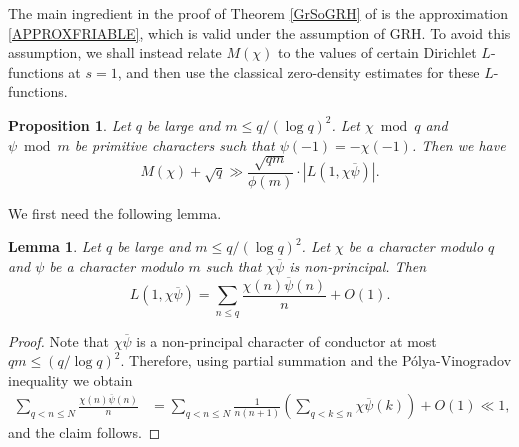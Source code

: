 \documentclass[12pt]{amsart}
\newtheorem{lem}[thm]{Lemma}
\newtheorem{pro}[thm]{Proposition}
\theoremstyle{definition}
\numberwithin{equation}{section}
\renewcommand{\bar}{\overline}
\begin{document}
The main ingredient in the proof of  Theorem \ref{GrSoGRH} of \cite{GrSo2} is the approximation \eqref{APPROXFRIABLE}, which is valid under the assumption of GRH. 
To avoid this assumption, we shall instead relate $M(\chi)$ to the values of certain Dirichlet $L$-functions at $s=1$, and then use the classical zero-density estimates for these $L$-functions. \begin{pro}\label{CharSumL1}
Let $q$ be large and $m \leq q/(\log q)^2$. Let $\chi\bmod q$ and $\psi\bmod m$ be primitive characters such that $\psi(-1)=-\chi(-1)$. Then we have
$$ M(\chi)+\sqrt{q} \gg \frac{\sqrt{qm}}{\phi(m)} \cdot \left|L\left(1, \chi\overline{\psi}\right)\right|.$$
\end{pro}
We first need the following lemma.
\begin{lem} \label{PVAPP}
Let $q$ be large and $m \leq q/(\log q)^2$. Let $\chi$ be a character modulo $q$ and $\psi$ be a character modulo $m$ such that $\chi \bar{\psi}$ is non-principal. Then
\begin{equation*}
L(1,\chi\bar{\psi}) = \sum_{n \leq q} \frac{\chi(n)\bar{\psi}(n)}{n} + O(1).
\end{equation*}
\end{lem}
\begin{proof}
Note that $\chi\bar{\psi}$ is a non-principal character of conductor at most $qm\leq (q/\log q)^2$. Therefore, using partial summation and the P\'{o}lya-Vinogradov inequality we obtain
\begin{align*}
\sum_{q < n \leq N} \frac{\chi(n)\bar{\psi}(n)}{n} &= \sum_{q<n\leq N} \frac{1}{n(n+1)}\left(\sum_{q < k \leq n} \chi\bar{\psi}(k)\right) +O(1) \ll 1,
\end{align*}
and the claim follows.
\end{proof}
\end{document}
